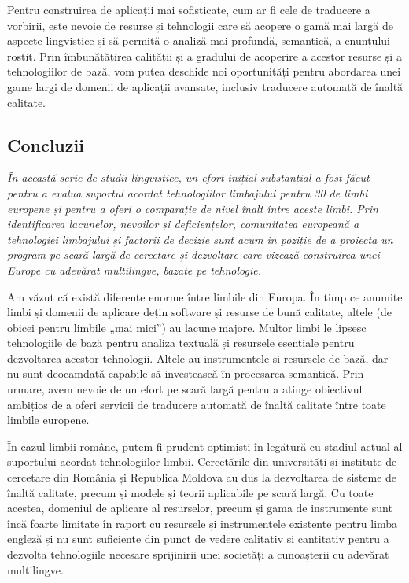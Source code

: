 \begin{multicols}{2}
Pentru construirea de aplicații mai sofisticate, cum ar fi cele de traducere a vorbirii, este nevoie de resurse și tehnologii care să acopere o gamă mai largă de aspecte lingvistice și să permită o analiză mai profundă, semantică, a enunțului rostit. Prin îmbunătățirea calității și a gradului de acoperire a acestor resurse și a tehnologiilor de bază, vom putea deschide noi oportunități pentru abordarea unei game largi de domenii de aplicații avansate, inclusiv traducere automată de înaltă calitate.

\subsection{Concluzii}

\emph{În această serie de studii lingvistice, un efort inițial substanțial a fost făcut pentru a evalua suportul acordat tehnologiilor limbajului pentru 30 de limbi europene și pentru a oferi o comparație de nivel înalt între aceste limbi. Prin identificarea lacunelor, nevoilor și deficiențelor, comunitatea europeană a tehnologiei limbajului și factorii de decizie sunt acum în poziție de a proiecta un program pe scară largă de cercetare și dezvoltare care vizează construirea unei Europe cu adevărat multilingve, bazate pe tehnologie.}

Am văzut că există diferențe enorme între limbile din Europa. În timp ce anumite limbi și domenii de aplicare dețin software și resurse de bună calitate, altele (de obicei pentru limbile „mai mici”) au lacune majore. Multor limbi le lipsesc tehnologiile de bază pentru analiza textuală și resursele esențiale pentru dezvoltarea acestor tehnologii. Altele au instrumentele și resursele de bază, dar nu sunt deocamdată capabile să investească în procesarea semantică. Prin urmare, avem nevoie de un efort pe scară largă pentru a atinge obiectivul ambițios de a oferi servicii de traducere automată de înaltă calitate între toate limbile europene.

În cazul limbii române, putem fi prudent optimiști în legătură cu stadiul actual al suportului acordat tehnologiilor limbii. Cercetările din universități și institute de cercetare din România și Republica Moldova au dus la dezvoltarea de sisteme de înaltă calitate, precum și modele și teorii aplicabile pe scară largă. Cu toate acestea, domeniul de aplicare al resurselor, precum și gama de instrumente sunt încă foarte limitate în raport cu resursele și instrumentele existente pentru limba engleză și nu sunt suficiente din punct de vedere calitativ și cantitativ pentru a dezvolta tehnologiile necesare sprijinirii unei societăți a cunoașterii cu adevărat multilingve. 


\end{multicols}
